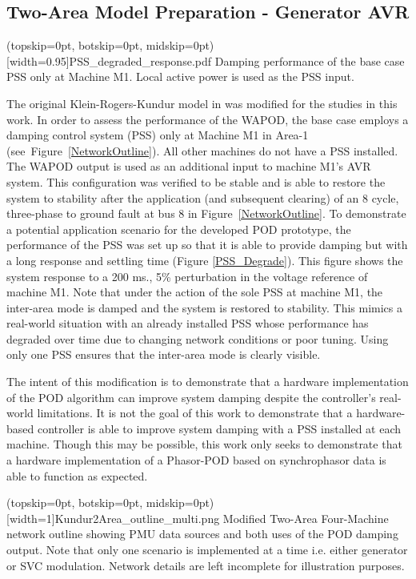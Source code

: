 \documentclass{ieeeaccess}
\begin{document}
\subsection{Two-Area Model Preparation - Generator AVR}

\Figure[tbp](topskip=0pt, botskip=0pt, midskip=0pt)[width=0.95\columnwidth]{PSS_degraded_response.pdf}
{Damping performance of the base case PSS only at Machine M1. Local active power is used as the PSS input.\label{PSS_Degrade}}

The original Klein-Rogers-Kundur model in \cite{KundurTwoArea} was modified for the studies in this work. In order to assess the performance of the WAPOD, the base case employs a damping control system (PSS) only at Machine M1 in Area-1 (see~Figure~\ref{NetworkOutline}). All other machines do not have a PSS installed. The WAPOD output is used as an additional input to machine M1\rq{s} AVR system. This configuration was  verified to be stable and is able to restore the system to stability after the application (and subsequent clearing) of an 8 cycle, three-phase to ground fault at bus 8 in Figure~\ref{NetworkOutline}. To demonstrate a potential application scenario for the developed POD prototype, the performance of the PSS was set up so that it is able to provide damping but with a long response and settling time (Figure \ref{PSS_Degrade}). This figure shows the system response to a 200 ms., 5\% perturbation in the voltage reference of machine M1. Note that under the action of the sole PSS at machine M1, the inter-area mode is damped and the system is restored to stability. This mimics a real-world situation with an already installed PSS whose performance has degraded over time due to changing network conditions or poor tuning. Using only one PSS ensures that the inter-area mode is clearly visible. 

The intent of this modification is to demonstrate that a hardware implementation of the POD algorithm can improve system damping despite the controller\rq{s} real-world limitations. It is not the goal of this work to demonstrate that a hardware-based controller is able to improve system damping with a PSS installed at each machine. Though this may be possible, this work only seeks to demonstrate that a hardware implementation of a Phasor-POD based on synchrophasor data is able to function as expected.

\Figure[tbp](topskip=0pt, botskip=0pt, midskip=0pt)[width=1\textwidth]{Kundur2Area_outline_multi.png}
{Modified Two-Area Four-Machine network outline showing PMU data sources and both uses of the POD damping output. Note that only one scenario is implemented at a time i.e. either generator or SVC modulation. Network details are left incomplete for illustration purposes.\label{NetworkOutline}} %
\end{document}
